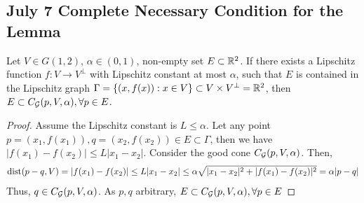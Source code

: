 \newpage
\subsection{July 7 Complete Necessary Condition for the Lemma}
\begin{lemma}\label{lemma:Suf-4-Geo-Lemma} Let $V\in G(1,2)$, $\alpha\in(0,1)$, non-empty set $E\subset \mathbb{R}^2$. If there exists a Lipschitz function $f: V\rightarrow V^\perp$ with Lipschitz constant at most $\alpha$, such that $E$ is contained in the Lipschitz graph $\Gamma = \{(x, f(x)) : x\in V\}\subset V\times V^\perp = \mathbb{R}^2$, then $E\subset C_\mathcal G(p, V, \alpha), \forall p\in E$.
\end{lemma}
\begin{proof}
    Assume the Lipschitz constant is $L\leq \alpha$. Let any point $p = (x_1, f(x_1)), q = (x_2, f(x_2))\in E\subset \Gamma$, then we have $|f(x_1)-f(x_2)| \leq L |x_1- x_2|$. Consider the good cone $C_\mathcal G(p, V, \alpha)$. Then, 
    \begin{equation*}
            \operatorname{dist}(p-q, V) = |f(x_1)- f(x_2)| 
            \leq L|x_1-x_2| 
            \leq \alpha \sqrt{|x_1-x_2|^2 + |f(x_1)-f(x_2)|^2}
            = \alpha |p-q|
    \end{equation*}
    Thus, $q\in C_\mathcal G(p, V, \alpha)$. As $p,q$ arbitrary, $E\subset C_\mathcal G(p, V, \alpha), \forall p\in E$
\end{proof}

